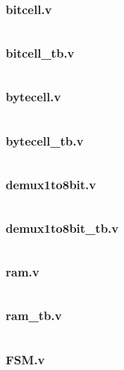 \subsubsection*{bitcell.v}
\inputminted{verilog}{../verilog_mem8x8_m_tri_state_buffer/bitcell.v}

\subsubsection*{bitcell\_tb.v}
\inputminted{verilog}{../verilog_mem8x8_m_tri_state_buffer/bitcell_tb.v}

\subsubsection*{bytecell.v}
\inputminted{verilog}{../verilog_mem8x8_m_tri_state_buffer/bytecell.v}

\subsubsection*{bytecell\_tb.v}
\inputminted{verilog}{../verilog_mem8x8_m_tri_state_buffer/bytecell_tb.v}

\subsubsection*{demux1to8bit.v}
\inputminted{verilog}{../verilog_mem8x8_m_tri_state_buffer/demux1to8bit.v}

\subsubsection*{demux1to8bit\_tb.v}
\inputminted{verilog}{../verilog_mem8x8_m_tri_state_buffer/demux1to8bit_tb.v}

\subsubsection*{ram.v}
\inputminted{verilog}{../verilog_mem8x8_m_tri_state_buffer/ram.v}

\subsubsection*{ram\_tb.v}
\inputminted{verilog}{../verilog_mem8x8_m_tri_state_buffer/ram_tb.v}

\subsubsection*{FSM.v}
\inputminted{verilog}{../verilog_mem8x8_m_tri_state_buffer/FSM.v}

